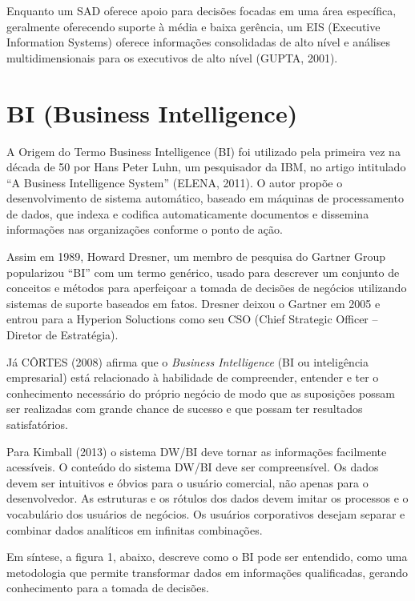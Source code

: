 Enquanto um SAD oferece apoio para decisões focadas em uma área específica, geralmente oferecendo suporte à média e baixa gerência, um EIS (Executive Information Systems) oferece informações consolidadas de alto nível e análises multidimensionais para os executivos de alto nível (GUPTA, 2001).

\section{BI (Business Intelligence)}

A Origem do Termo Business Intelligence (BI) foi utilizado pela primeira vez na década de 50 por Hans Peter Luhn, um pesquisador da IBM, no artigo intitulado “A Business Intelligence System” (ELENA, 2011). O autor propõe o desenvolvimento de sistema automático, baseado em máquinas de processamento de dados, que indexa e codifica automaticamente documentos e dissemina informações nas organizações conforme o ponto de ação.

Assim em 1989, Howard Dresner, um membro de pesquisa do Gartner Group popularizou “BI” com um termo genérico, usado para descrever um conjunto de conceitos e métodos para aperfeiçoar a tomada de decisões de negócios utilizando sistemas de suporte baseados em fatos. Dresner deixou o Gartner em 2005 e entrou para a Hyperion Soluctions como seu CSO (Chief Strategic Officer – Diretor de Estratégia).

J\'{a} CÔRTES (2008) afirma que o \textit{Business Intelligence} (BI ou inteligência empresarial) est\'{a} relacionado \`{a} habilidade de compreender, entender e ter o conhecimento necess\'{a}rio do próprio negócio de modo que as suposi\c{c}ões possam ser realizadas com grande chance de sucesso e que possam ter resultados satisfatórios.

Para Kimball (2013) o sistema DW/BI deve tornar as informa\c{c}ões facilmente acessíveis. O conteúdo do sistema DW/BI deve ser compreensível. Os dados devem ser intuitivos e óbvios para o usu\'{a}rio comercial, n\~{a}o apenas para o desenvolvedor. As estruturas e os rótulos dos dados devem imitar os processos e o vocabul\'{a}rio dos usu\'{a}rios de negócios. Os usu\'{a}rios corporativos desejam separar e combinar dados analíticos em infinitas combina\c{c}ões.

Em síntese, a figura 1, abaixo, descreve como o BI pode ser entendido, como uma metodologia que permite transformar dados em informações qualificadas, gerando conhecimento para a tomada de decisões.

